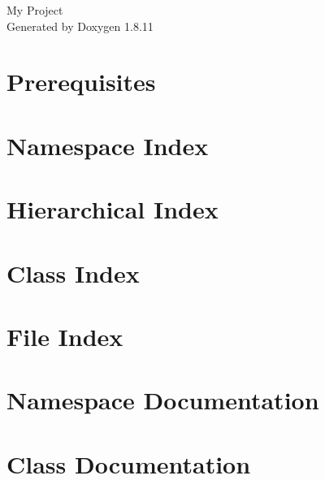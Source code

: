 \documentclass[twoside]{book}
\newcommand{\+}{\discretionary{\mbox{\scriptsize$\hookleftarrow$}}{}{}}
\newcommand{\clearemptydoublepage}{%
  \newpage{\pagestyle{empty}\cleardoublepage}%
}
\begin{document}
\hypersetup{pageanchor=false,
             bookmarksnumbered=true,
             pdfencoding=unicode
            }
\begin{titlepage}
\vspace*{7cm}
\begin{center}%
{\Large My Project }\\
\vspace*{1cm}
{\large Generated by Doxygen 1.8.11}\\
\end{center}
\end{titlepage}
\clearemptydoublepage
\tableofcontents
\clearemptydoublepage
{}
\hypersetup{pageanchor=true}

\chapter{Prerequisites}
\label{md_README}
\hypertarget{md_README}{}

\chapter{Namespace Index}

\chapter{Hierarchical Index}

\chapter{Class Index}

\chapter{File Index}

\chapter{Namespace Documentation}


\chapter{Class Documentation}


















\end{document}
